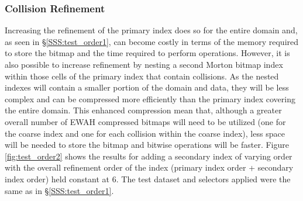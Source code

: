 \documentclass[apjl]{emulateapj}
\begin{document}
\subsubsection{Collision Refinement}\label{SSS:test_order2}
Increasing the refinement of the primary index does so for the entire domain and, as seen in \S\ref{SSS:test_order1}, can become costly in terms of the memory required to store the bitmap and the time required to perform operations. However, it is also possible to increase refinement by nesting a second Morton bitmap index within those cells of the primary index that contain collisions. As the nested indexes will contain a smaller portion of the domain and data, they will be less complex and can be compressed more efficiently than the primary index covering the entire domain. This enhanced compression mean that, although a greater overall number of EWAH compressed bitmaps will need to be utilized (one for the coarse index and one for each collision within the coarse index), less space will be needed to store the bitmap and bitwise operations will be faster. Figure \ref{fig:test_order2} shows the results for adding a secondary index of varying order with the overall refinement order of the index (primary index order + secondary index order) held constant at 6. The test dataset and selectors applied were the same as in \S\ref{SSS:test_order1}.
%
\end{document}
